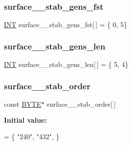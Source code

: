 \subsubsection{\texorpdfstring{surface\+\_\+\_\+stab\+\_\+gens\+\_\+fst}{surface\_9\_stab\_gens\_fst}}
{\footnotesize\ttfamily \mbox{\hyperlink{galois_8h_a09fddde158a3a20bd2dcadb609de11dc}{I\+NT}} surface\+\_\+\_\+stab\+\_\+gens\+\_\+fst\mbox{[}$\,$\mbox{]} = \{ 0, 5\}}

\mbox{\label{surface__9_8_c_a33edca07e7aaf00856914adb5a42d4c3}} 
\subsubsection{\texorpdfstring{surface\+\_\+\_\+stab\+\_\+gens\+\_\+len}{surface\_9\_stab\_gens\_len}}
{\footnotesize\ttfamily \mbox{\hyperlink{galois_8h_a09fddde158a3a20bd2dcadb609de11dc}{I\+NT}} surface\+\_\+\_\+stab\+\_\+gens\+\_\+len\mbox{[}$\,$\mbox{]} = \{ 5, 4\}}

\mbox{\label{surface__9_8_c_a889a8d0b9ab6053d7f2c22b29777262f}} 
\subsubsection{\texorpdfstring{surface\+\_\+\_\+stab\+\_\+order}{surface\_9\_stab\_order}}
{\footnotesize\ttfamily const \mbox{\hyperlink{galois_8h_ab6cc7b4aeb6ea31aba2b3fbfc83ff5e6}{B\+Y\+TE}}$\ast$ surface\+\_\+\_\+stab\+\_\+order\mbox{[}$\,$\mbox{]}}

{\bfseries Initial value\+:}
\begin{DoxyCode}
= \{
    \textcolor{stringliteral}{"240"},
    \textcolor{stringliteral}{"432"},
\}
\end{DoxyCode}
